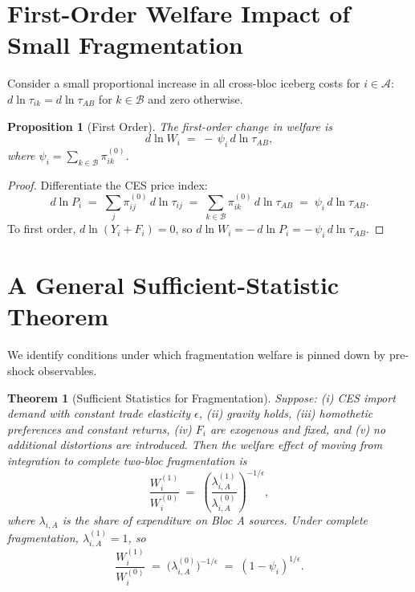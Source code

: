 \documentclass[11pt]{article}
\newtheorem{proposition}{Proposition}
\newtheorem{theorem}{Theorem}
\begin{document}
\section{First-Order Welfare Impact of Small Fragmentation}

Consider a small proportional increase in all cross-bloc iceberg costs for $i\in\mathcal{A}$: $d\ln\tau_{ik} = d\ln\tau_{AB}$ for $k\in\mathcal{B}$ and zero otherwise.

\begin{proposition}[First Order]\label{prop:FO}
The first-order change in welfare is
\begin{equation}
d\ln W_i \;=\; -\,\psi_i\, d\ln \tau_{AB},
\end{equation}
where $\psi_i = \sum_{k\in\mathcal{B}} \pi_{ik}^{(0)}$.
\end{proposition}

\begin{proof}
Differentiate the CES price index:
\begin{equation}
d\ln P_i \;=\; \sum_{j} \pi_{ij}^{(0)}\, d\ln \tau_{ij} \;=\; \sum_{k\in\mathcal{B}} \pi_{ik}^{(0)}\, d\ln \tau_{AB} \;=\; \psi_i\, d\ln \tau_{AB}.
\end{equation}
To first order, $d\ln(Y_i+F_i)=0$, so $d\ln W_i = -\,d\ln P_i = -\,\psi_i\, d\ln\tau_{AB}$.
\end{proof}

\section{A General Sufficient-Statistic Theorem}

We identify conditions under which fragmentation welfare is pinned down by pre-shock observables.

\begin{theorem}[Sufficient Statistics for Fragmentation]\label{thm:SS}
Suppose: (i) CES import demand with constant trade elasticity $\epsilon$, (ii) gravity holds, (iii) homothetic preferences and constant returns, (iv) $F_i$ are exogenous and fixed, and (v) no additional distortions are introduced. Then the welfare effect of moving from integration to complete two-bloc fragmentation is
\begin{equation}
\frac{W_i^{(1)}}{W_i^{(0)}} \;=\; \left(\frac{\lambda_{i,A}^{(1)}}{\lambda_{i,A}^{(0)}}\right)^{-1/\epsilon},
\end{equation}
where $\lambda_{i,A}$ is the share of expenditure on Bloc A sources. Under complete fragmentation, $\lambda_{i,A}^{(1)}=1$, so
\begin{equation}
\frac{W_i^{(1)}}{W_i^{(0)}} \;=\; \big(\lambda_{i,A}^{(0)}\big)^{-1/\epsilon} \;=\; (1-\psi_i)^{1/\epsilon}.
\end{equation}
\end{theorem}
\end{document}
